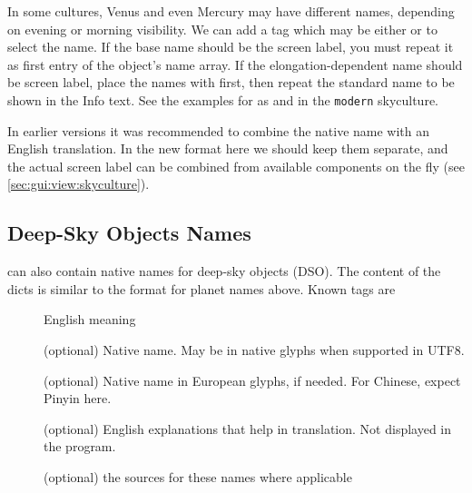 In some cultures, Venus and even Mercury may have different names, depending on evening or morning visibility. 
We can add a tag  which may be either  or  to select the name. 
If the base name should be the screen label, you must repeat it as first entry of the object's  name array. 
If the elongation-dependent name should be screen label, place the names with  first, then repeat the 
standard name to be shown in the Info text. 
See the examples for  as  and  in the \texttt{modern} skyculture.

In earlier versions it was recommended to combine the native name with an English translation. 
In the new format here we should keep them separate, and the actual screen label can be combined from available 
components on the fly (see \ref{sec:gui:view:skyculture}).



\subsection{Deep-Sky Objects Names}
\label{sec:skycultures:dsonames}

 can also contain native names for
deep-sky objects (DSO). The content  of the dicts is similar to the 
format for planet names above. %
Known tags are 
\begin{description}
\item[] English meaning
\item[] (optional) Native name. May be in native glyphs when supported in UTF8.
\item[] (optional) Native name in European glyphs, if needed. For Chinese, expect Pinyin here.
\item[] (optional) English explanations that help in translation. Not displayed in the program.
\item[]  (optional) the sources for these names where applicable
\end{description}

